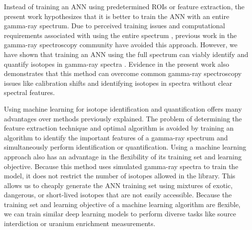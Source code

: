 Instead of training an ANN using predetermined ROIs or feature extraction, the present work hypothesizes that it is better to train the ANN with an entire gamma-ray spectrum. Due to perceived training issues and computational requirements associated with using the entire spectrum \cite{Pilato1999,Yoshida2002}, previous work in the gamma-ray spectroscopy community have avoided this approach. However, we have shown that training an ANN using the full spectrum can viably identify and quantify isotopes in gamma-ray spectra \cite{kamuda2017,kamudaThesis2017,kamuda2018}. Evidence in the present work also demonstrates that this method can overcome common gamma-ray spectroscopy issues like calibration shifts and identifying isotopes in spectra without clear spectral features.



Using machine learning for isotope identification and quantification offers many advantages over methods previously explained. The problem of determining the feature extraction technique and optimal algorithm is avoided by training an algorithm to identify the important features of a gamma-ray spectrum and simultaneously perform identification or quantification. Using a machine learning approach also has an advantage in the flexibility of its training set and learning objective. Because this method uses simulated gamma-ray spectra to train the model, it does not restrict the number of isotopes allowed in the library. This allows us to cheaply generate the ANN training set using mixtures of exotic, dangerous, or short-lived isotopes that are not easily accessible. Because the training set and learning objective of a machine learning algorithm are flexible, we can train similar deep learning models to perform diverse tasks like source interdiction or uranium enrichment measurements.

